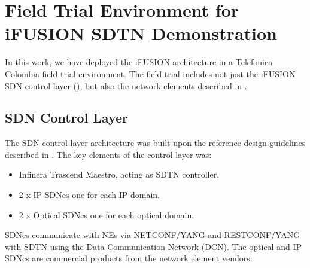 \documentclass[10pt, conference]{IEEEtran}
\begin{document}



\section{Field Trial Environment for i\uppercase{FUSION} SDTN Demonstration}
\label{section:trial}

In this work, we have deployed the i\uppercase{Fusion} architecture in a Telefonica Colombia field trial environment. The field trial includes not just the i\uppercase{FUSION} SDN control layer (), but also the network elements described in .%

\subsection{SDN Control Layer}
\label{sec:contollay}
The SDN control layer architecture was built upon the reference design guidelines described in . The key elements of the control layer was:
\begin{itemize}
    \item Infinera Trascend Maestro, acting as SDTN controller.
    \item 2 x IP SDNcs one for each IP domain. 
    \item 2 x Optical SDNcs one for each optical domain.
\end{itemize}

SDNcs communicate with NEs via NETCONF/YANG and RESTCONF/YANG with SDTN  using the Data Communication Network (DCN). The optical and IP SDNcs are commercial products from the network element vendors.  
\end{document}
